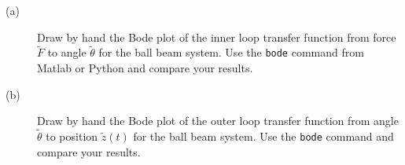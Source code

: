\begin{description}
\item[(a)] Draw by hand the Bode plot of the inner loop transfer function from force $\tilde{F}$ to angle $\tilde{\theta}$ for the ball beam system.
Use the \texttt{bode} command from Matlab or Python and compare your results.
\item[(b)] Draw by hand the Bode plot of the outer loop transfer function from angle $\tilde{\theta}$ to position $\tilde{z}(t)$ for the ball beam system. Use the \texttt{bode} command and compare your results.
\end{description}

